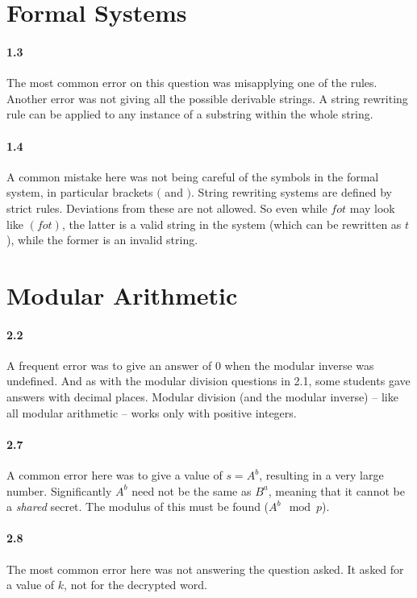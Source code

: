 \documentclass{article}
\begin{document}
\section{Formal Systems}

\paragraph{1.3} The most common error on this question was misapplying one of the rules. Another error was not giving all the possible derivable strings. A string rewriting rule can be applied to any instance of a substring within the whole string.

\paragraph{1.4} A common mistake here was not being careful of the symbols in the formal system, in particular brackets $($ and $)$. String rewriting systems are defined by strict rules. Deviations from these are not allowed. So even while $fot$ may look like $(fot)$, the latter is a valid string in the system (which can be rewritten as $t$), while the former is an invalid string.

\section{Modular Arithmetic}

\paragraph{2.2} A frequent error was to give an answer of 0 when the modular inverse was undefined. And as with the modular division questions in 2.1, some students gave answers with decimal places. Modular division (and the modular inverse) -- like all modular arithmetic -- works only with positive integers.

\paragraph{2.7} A common error here was to give a value of $s = A^b$, resulting in a very large number. Significantly $A^b$ need not be the same as $B^a$, meaning that it cannot be a \emph{shared} secret. The modulus of this must be found ($A^b \mod p$).

\paragraph{2.8} The most common error here was not answering the question asked. It asked for a value of $k$, not for the decrypted word.
\end{document}
